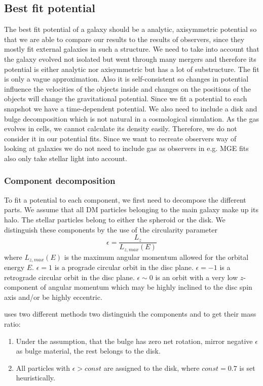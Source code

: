 \subsection{Best fit potential}\label{subsec:best_fit_pot}
The best fit potential of a galaxy should be a analytic, axisymmetric potential so that we are able  to compare our results to the results of observers, since they mostly fit external galaxies in such a structure. We need to take into account that the galaxy evolved not isolated but went through many mergers and therefore its potential is either analytic nor axisymmetric but has a lot of substructure. The fit is only a vague approximation. Also it is self-consistent so changes in potential influence the velocities of the objects inside and changes on the positions of the objects will change the gravitational potential. Since we fit a potential to each snapshot we have a time-dependent potential. We also need to include a disk and bulge decomposition which is not natural in a cosmological simulation. As the gas evolves in cells, we cannot calculate its density easily. Therefore, we do not consider it in our potential fits. Since we want to recreate observers way of looking at galaxies we do not need to include gas as observers in e.g. \ac{MGE} fits \citep{MGE...Monnet, MGE...Emsellem} also only take stellar light into account. 

\subsubsection{Component decomposition}\label{subsubsec:decomp}
To fit a potential to each component, we first need to decompose the different parts. We assume that all \ac{DM} particles belonging to the main galaxy make up its halo. The stellar particles belong to either the spheroid or the disk. We distinguish these components by the use of the circularity parameter 
\begin{equation}
    \epsilon = \frac{L_z}{L_{z,max}(E)}
\end{equation}
where $L_{z,max}(E)$ is the maximum angular momentum allowed for the orbital energy $E$. 
$\epsilon = 1$ is a prograde circular orbit in the disc plane. $\epsilon = -1$ is a retrograde circular orbit in the disc plane. $\epsilon \sim 0$ is an orbit with a very low $z$-component of angular momentum which may be highly inclined to the disc spin axis and/or be highly eccentric.  

\cite{AurigaGrand} uses two different methods two distinguish the components and to get their mass ratio:
\begin{enumerate}
\item Under the assumption, that the bulge has zero net rotation, mirror negative $\epsilon$ as bulge material, the rest belongs to the disk.
\item All particles with $\epsilon > const$ are assigned to the disk, where $const = 0.7$ is set heuristically.
\end{enumerate}

